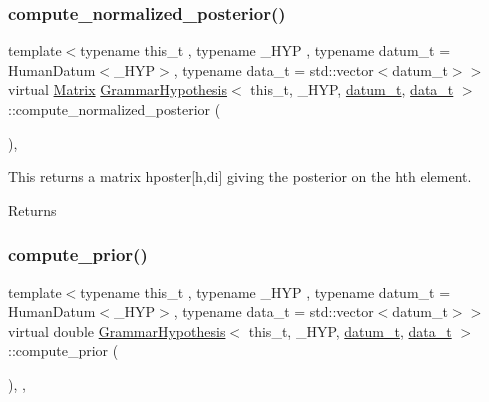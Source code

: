 \mbox{\label{class_grammar_hypothesis_a2e4105060c6b5e96679fdb116591b3f1}} 
\subsubsection{\texorpdfstring{compute\+\_\+normalized\+\_\+posterior()}{compute\_normalized\_posterior()}}
{\footnotesize\ttfamily template$<$typename this\+\_\+t , typename \+\_\+\+H\+YP , typename datum\+\_\+t  = Human\+Datum$<$\+\_\+\+H\+Y\+P$>$, typename data\+\_\+t  = std\+::vector$<$datum\+\_\+t$>$$>$ \\
virtual \hyperlink{_eigen_lib_8h_a645222978e81acfb2523a9bce34aecc0}{Matrix} \hyperlink{class_grammar_hypothesis}{Grammar\+Hypothesis}$<$ this\+\_\+t, \+\_\+\+H\+YP, \hyperlink{class_bayesable_a9f1a6c0cd7855550fa10b1a8f13a5867}{datum\+\_\+t}, \hyperlink{class_bayesable_aa2788c4d7718c0a824e1d28c4c98f921}{data\+\_\+t} $>$\+::compute\+\_\+normalized\+\_\+posterior (\begin{DoxyParamCaption}{ }\end{DoxyParamCaption})\hspace{0.3cm}{\ttfamily [inline]}, {\ttfamily [virtual]}}



This returns a matrix hposter\mbox{[}h,di\mbox{]} giving the posterior on the h\textquotesingle{}th element. 

\begin{DoxyReturn}{Returns}

\end{DoxyReturn}
\mbox{\label{class_grammar_hypothesis_a8ad537345ab55b581825b89c9b2cfad3}} 
\subsubsection{\texorpdfstring{compute\+\_\+prior()}{compute\_prior()}}
{\footnotesize\ttfamily template$<$typename this\+\_\+t , typename \+\_\+\+H\+YP , typename datum\+\_\+t  = Human\+Datum$<$\+\_\+\+H\+Y\+P$>$, typename data\+\_\+t  = std\+::vector$<$datum\+\_\+t$>$$>$ \\
virtual double \hyperlink{class_grammar_hypothesis}{Grammar\+Hypothesis}$<$ this\+\_\+t, \+\_\+\+H\+YP, \hyperlink{class_bayesable_a9f1a6c0cd7855550fa10b1a8f13a5867}{datum\+\_\+t}, \hyperlink{class_bayesable_aa2788c4d7718c0a824e1d28c4c98f921}{data\+\_\+t} $>$\+::compute\+\_\+prior (\begin{DoxyParamCaption}{ }\end{DoxyParamCaption})\hspace{0.3cm}{\ttfamily [inline]}, {\ttfamily [override]}, {\ttfamily [virtual]}}



